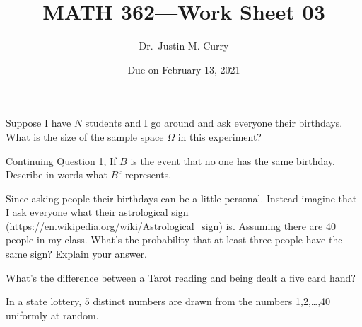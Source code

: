 \documentclass[addpoints,12pt]{exam}
\title{\vspace{-1in} MATH 362---Work Sheet 03}
\date{Due on February 13, 2021}
\author{Dr.~Justin M. Curry}
\begin{document}
\maketitle


\begin{questions}

\question[1] Suppose I have $N$ students and I go around and ask everyone their birthdays. What is the size of the sample space $\Omega$ in this experiment? 

\question[1] Continuing Question 1, If $B$ is the event that no one has the same birthday. Describe in words what $B^c$ represents.

\question[2] Since asking people their birthdays can be a little personal. Instead imagine that I ask everyone what their astrological sign (\url{https://en.wikipedia.org/wiki/Astrological_sign}) is. Assuming there are 40 people in my class. What's the probability that at least three people have the same sign? Explain your answer.

\question[1] What's the difference between a Tarot reading and being dealt a five card hand?

\question[3] In a state lottery, 5 distinct numbers are drawn from the numbers 1,2,\ldots,40 uniformly at random.
\noaddpoints
{}
\end{questions}
\end{document}
